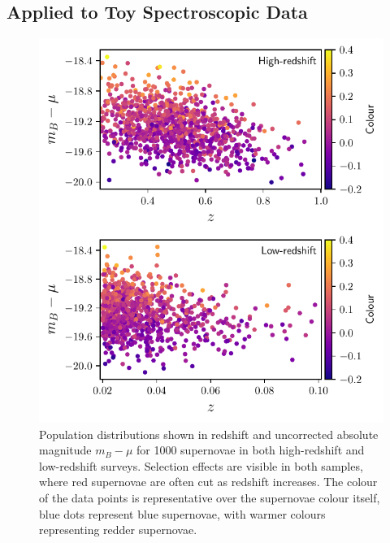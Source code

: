 \documentclass[a4paper,fleqn,usenatbib]{mnras}
\begin{document}
\subsection{Applied to Toy Spectroscopic Data}
\label{sec:toy}


\begin{figure}
	\begin{center}
		\includegraphics[width=\columnwidth]{plot_pop_simple.pdf}
	\end{center}
	\caption{Population distributions shown in redshift and uncorrected absolute magnitude $m_B - \mu$ for 1000 supernovae in both high-redshift and low-redshift surveys. Selection effects are visible in both samples, where red supernovae are often cut as redshift increases. The colour of the data points is representative over the supernovae colour itself, blue dots represent blue supernovae, with warmer colours representing redder supernovae.}
	\label{fig:simple_pop}
\end{figure}
\end{document}
